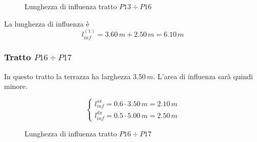 \begin{figure}
	\centering
	\caption{Lunghezza di influenza tratto $P13\div P16$}
	\label{fig:infLength_1}
\end{figure}

La lunghezza di influenza è
\[
	l_{inf}^{(1)} = 3.60\,m + 2.50\,m = 6.10\,m
\]

\subsubsection*{Tratto $P16\div P17$}
In questo tratto la terrazza ha larghezza $3.50\,m$. L'area di influenza sarà quindi minore.

\begin{equation*}
	\begin{cases}
		l_{inf}^{sx} = 0.6\cdot 3.50\,m = 2.10\,m\\
		l_{inf}^{dx} = 0.5\cdot 5.00\,m = 2.50\,m
	\end{cases}
\end{equation*}

\begin{figure}
	\centering
	\caption{Lunghezza di influenza tratto $P16\div P17$}
	\label{fig:infLength_2}
\end{figure}

